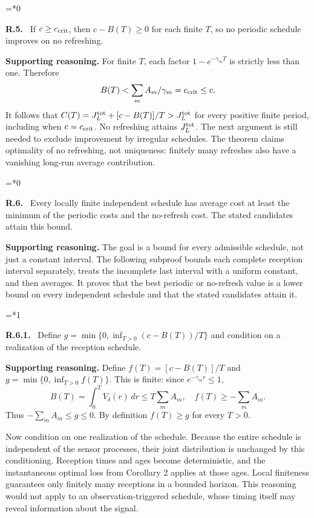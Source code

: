 \documentclass[12pt,letterpaper]{article}
\newenvironment{proofstep}[2]{%
  \begin{list}{}{\leftmargin=\dimexpr 0.17in*#2\relax%
  \setlength{\rightmargin}{0pt}\setlength{\topsep}{5pt}\setlength{\parsep}{2pt}}%
  \item[]\textbf{\textcolor{ink}{#1.}}\ }{\end{list}}
\begin{document}
\begin{proofstep}{R.5}{0}
\label{step:R.5}
If $c\ge c_{\rm crit}$, then $c-B(T)\ge0$ for each finite $T$, so no periodic schedule improves on no refreshing.

\textbf{Supporting reasoning.}
For finite $T$, each factor $1-e^{-\gamma_mT}$ is strictly less than one. Therefore
\[
B(T)<\sum_mA_m/\gamma_m=c_{\rm crit}\le c.
\]
It follows that $C(T)=J_L^{\rm tot}+[c-B(T)]/T>J_L^{\rm tot}$ for every positive finite period, including when $c=c_{\rm crit}$. No refreshing attains $J_L^{\rm tot}$. The next argument is still needed to exclude improvement by irregular schedules. The theorem claims optimality of no refreshing, not uniqueness: finitely many refreshes also have a vanishing long-run average contribution.
\par{}
\end{proofstep}

\begin{proofstep}{R.6}{0}
\label{step:R.6}
Every locally finite independent schedule has average cost at least the minimum of the periodic costs and the no-refresh cost. The stated candidates attain this bound.

\textbf{Supporting reasoning.}
The goal is a bound for every admissible schedule, not just a constant interval. The following subproof bounds each complete reception interval separately, treats the incomplete last interval with a uniform constant, and then averages. It proves that the best periodic or no-refresh value is a lower bound on every independent schedule and that the stated candidates attain it.
\par{}
\end{proofstep}

\begin{proofstep}{R.6.1}{1}
\label{step:R.6.1}
Define $g=\min\{0,\inf_{T>0}(c-B(T))/T\}$ and condition on a realization of the reception schedule.

\textbf{Supporting reasoning.}
Define $f(T)=[c-B(T)]/T$ and $g=\min\{0,\inf_{T>0}f(T)\}$. This is finite: since $e^{-\gamma_m r}\le1$,
\[
B(T)=\int_0^T V_\delta(r)\,dr\le T\sum_m A_m,
\quad f(T)\ge-\sum_m A_m.
\]
Thus $-\sum_m A_m\le g\le0$. By definition $f(T)\ge g$ for every $T>0$.

Now condition on one realization of the schedule. Because the entire schedule is independent of the sensor processes, their joint distribution is unchanged by this conditioning. Reception times and ages become deterministic, and the instantaneous optimal loss from Corollary 2 applies at those ages. Local finiteness guarantees only finitely many receptions in a bounded horizon. This reasoning would not apply to an observation-triggered schedule, whose timing itself may reveal information about the signal.
\par{}
\end{proofstep}
\end{document}
